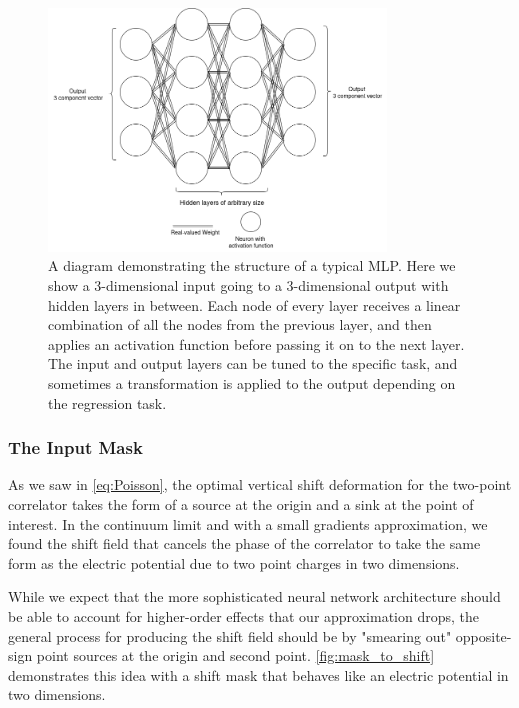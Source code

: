 \documentclass[12pt]{article}
\begin{document}
\begin{figure}[h!]
	\centering
	\includegraphics[width=0.8\textwidth]{figures/MLP.drawio.png}
	\caption[Multilayer Perceptron]{A diagram demonstrating the structure of a typical MLP. Here we show a 3-dimensional input going to
	a 3-dimensional output with hidden layers in between. Each node of every layer receives a linear combination of all the nodes
	from the previous layer, and then applies an activation function before passing it on to the next layer. The input and output
	layers can be tuned to the specific task, and sometimes a transformation is applied to the output depending on the regression task.}
	\label{fig:mlp}
\end{figure}

\subsubsection{The Input Mask}

As we saw in \ref{eq:Poisson}, the optimal vertical shift deformation for the two-point correlator takes the form of a source at the origin and
a sink at the point of interest. In the continuum limit and with a small gradients approximation, we found the shift field that cancels the phase of
the correlator to take the same form as the electric potential due to two point charges in two dimensions. 

While we expect that the more sophisticated neural network architecture should be able to account for higher-order effects that our approximation drops, 
the general process for producing the shift field should be by "smearing out" opposite-sign point sources at the origin and second point. \ref{fig:mask_to_shift} 
demonstrates this idea with a shift mask that behaves like an electric potential in two dimensions.
\end{document}
